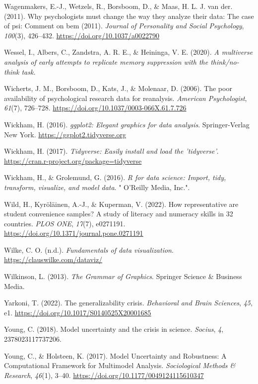 \documentclass[
  letterpaper,
  DIV=11,
  numbers=noendperiod]{scrreprt}
\newlength{\cslhangindent}
\newlength{\cslentryspacingunit} %
\newenvironment{CSLReferences}[2] %
 {%
  \setlength{\parindent}{0pt}
  \ifodd #1
  \let\oldpar\par
  \def\par{\hangindent=\cslhangindent\oldpar}
  \fi
  \setlength{\parskip}{#2\cslentryspacingunit}
 }%
 {}
\begin{document}
\begin{CSLReferences}{1}{0}
\leavevmode{}%
Wagenmakers, E.-J., Wetzels, R., Borsboom, D., \& Maas, H. L. J. van
der. (2011). Why psychologists must change the way they analyze their
data: The case of psi: Comment on bem (2011). \emph{Journal of
Personality and Social Psychology}, \emph{100}(3), 426--432.
\url{https://doi.org/10.1037/a0022790}

\leavevmode{}%
Wessel, I., Albers, C., Zandstra, A. R. E., \& Heininga, V. E. (2020).
\emph{A multiverse analysis of early attempts to replicate memory
suppression with the think/no-think task}.

\leavevmode{}%
Wicherts, J. M., Borsboom, D., Kats, J., \& Molenaar, D. (2006). The
poor availability of psychological research data for reanalysis.
\emph{American Psychologist}, \emph{61}(7), 726--728.
\url{https://doi.org/10.1037/0003-066X.61.7.726}

\leavevmode{}%
Wickham, H. (2016). \emph{ggplot2: Elegant graphics for data analysis}.
Springer-Verlag New York. \url{https://ggplot2.tidyverse.org}

\leavevmode{}%
Wickham, H. (2017). \emph{Tidyverse: Easily install and load the
'tidyverse'}. \url{https://cran.r-project.org/package=tidyverse}

\leavevmode{}%
Wickham, H., \& Grolemund, G. (2016). \emph{R for data science: Import,
tidy, transform, visualize, and model data}. {"} O'Reilly Media,
Inc.{"}.

\leavevmode{}%
Wild, H., Kyröläinen, A.-J., \& Kuperman, V. (2022). How representative
are student convenience samples? A study of literacy and numeracy skills
in 32 countries. \emph{PLOS ONE}, \emph{17}(7), e0271191.
\url{https://doi.org/10.1371/journal.pone.0271191}

\leavevmode{}%
Wilke, C. O. (n.d.). \emph{Fundamentals of data visualization}.
\url{https://clauswilke.com/dataviz/}

\leavevmode{}%
Wilkinson, L. (2013). \emph{The Grammar of Graphics}. Springer Science
\& Business Media.

\leavevmode{}%
Yarkoni, T. (2022). The generalizability crisis. \emph{Behavioral and
Brain Sciences}, \emph{45}, e1.
\url{https://doi.org/10.1017/S0140525X20001685}

\leavevmode{}%
Young, C. (2018). Model uncertainty and the crisis in science.
\emph{Socius}, \emph{4}, 2378023117737206.

\leavevmode{}%
Young, C., \& Holsteen, K. (2017). Model Uncertainty and Robustness: A
Computational Framework for Multimodel Analysis. \emph{Sociological
Methods \& Research}, \emph{46}(1), 3--40.
\url{https://doi.org/10.1177/0049124115610347}

\end{CSLReferences}
\end{document}
